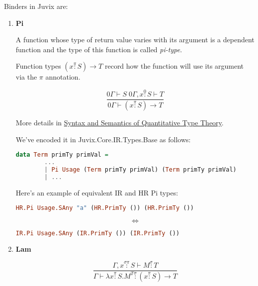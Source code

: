 \documentclass[acmsmall]{acmart}
\numberwithin{figure}{subsection}
\begin{document}
Binders in Juvix are:
\begin{enumerate}
    \item \textbf{Pi}

    A function whose type of return value varies with its argument is a dependent function and the type of this function is called \textit{pi-type}.
    
    Function types $(x \stackrel{\pi}{:} S) \rightarrow T$ record how the function will use its argument via the $\pi$ annotation.

    \begin{equation*}
       \dfrac{0\Gamma \vdash S \; 0 \Gamma, x \stackrel{0}{:} S \vdash T }{0 \Gamma \vdash (x \stackrel{\pi}{:} S) \rightarrow T} 
    \end{equation*}

    More details in \href{https://bentnib.org/quantitative-type-theory.pdf}{Syntax and Semantics of Quantitative Type Theory}.

    \bigskip

    We've encoded it in Juvix.Core.IR.Types.Base as follows:
    \begin{lstlisting}[language=haskell]
data Term primTy primVal = 
        ...
        | Pi Usage (Term primTy primVal) (Term primTy primVal)
        | ...
    \end{lstlisting}

    Here's an example of equivalent IR and HR Pi types:

    \begin{lstlisting}[language=haskell]
        HR.Pi Usage.SAny "a" (HR.PrimTy ()) (HR.PrimTy ())
    \end{lstlisting}
    \begin{equation*}
      \Leftrightarrow  
    \end{equation*}
    \begin{lstlisting}[language=haskell]
        IR.Pi Usage.SAny (IR.PrimTy ()) (IR.PrimTy ())
    \end{lstlisting}
    \item \textbf{Lam}

    \begin{equation*}
       \dfrac{\Gamma, x \stackrel{\sigma \pi}{:} S \vdash M \stackrel{\sigma}{:} T }{\Gamma \vdash \lambda x \stackrel{\pi}{:} S .M^T \stackrel{\sigma}{:} (x \stackrel{\pi}{:} S) \rightarrow T} 
    \end{equation*}


\end{enumerate}
\end{document}
